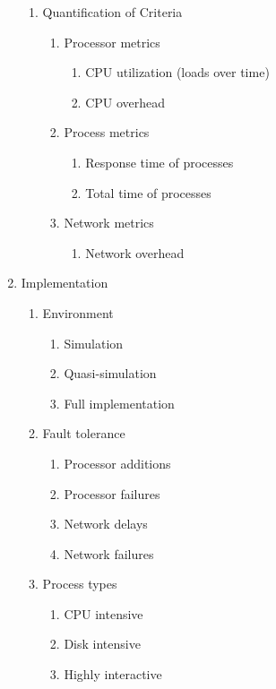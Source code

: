 \documentclass{slides}
\begin{document}
\begin{enumerate}
\begin{enumerate}
		\item Quantification of Criteria
		\begin{enumerate}
			\item Processor metrics
			\begin{enumerate}
				\item CPU utilization (loads over time)
				\item CPU overhead
			\end{enumerate}

			\item Process metrics
			\begin{enumerate}
				\item Response time of processes
				\item Total time of processes
			\end{enumerate}

			\item Network metrics
			\begin{enumerate}
				\item Network overhead
			\end{enumerate}
		\end{enumerate}
	\end{enumerate}

	\item Implementation

	\begin{enumerate}
		\item Environment
		\begin{enumerate}
			\item Simulation
			\item Quasi-simulation
			\item Full implementation
		\end{enumerate}

		\item Fault tolerance
		\begin{enumerate}
			\item Processor additions
			\item Processor failures
			\item Network delays
			\item Network failures
		\end{enumerate}

		\item Process types
		\begin{enumerate}
			\item CPU intensive
			\item Disk intensive
			\item Highly interactive
		\end{enumerate}


\end{enumerate}
\end{enumerate}
\end{document}
